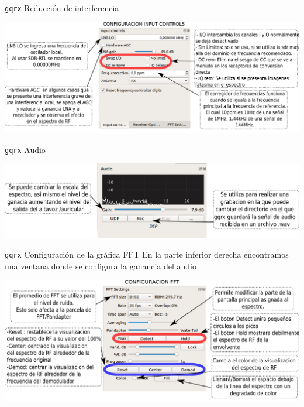 \begin{frame}{{\tt gqrx} Reducción de interferencia}

\begin{center}
\vspace{-0.3cm}
\includegraphics[width=\textwidth]{parte2/lab6/pdf/lab6_p_5.pdf}
\end{center}

\end{frame}

\begin{frame}{{\tt gqrx} Audio}

\begin{center}
\vspace{-0.3cm}
\includegraphics[width=\textwidth]{parte2/lab6/pdf/lab6_p_6.pdf}
\end{center}

\end{frame}

\begin{frame}{{\tt gqrx} Configuración de la gráfica FFT}
En la parte inferior derecha encontramos una ventana donde se configura la ganancia del audio
\begin{center}
\vspace{-0.3cm}
\includegraphics[width=\textwidth]{parte2/lab6/pdf/lab6_p_7.pdf}
\end{center}

\end{frame}

